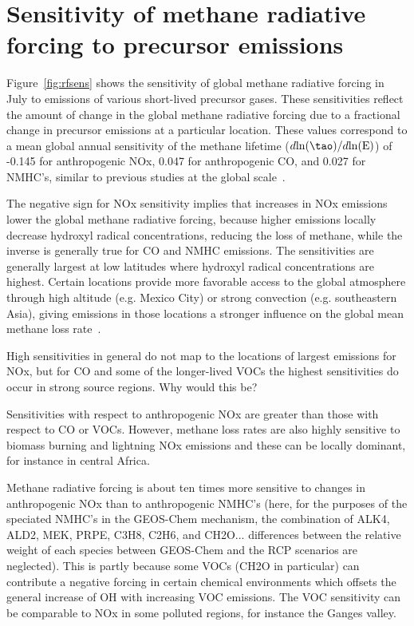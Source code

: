 \section{Sensitivity of methane radiative forcing to precursor emissions}

Figure~\ref{fig:rfsens} shows the sensitivity of global methane radiative forcing in July to emissions of various short-lived precursor gases. These sensitivities reflect the amount of change in the global methane radiative forcing due to a fractional change in precursor emissions at a particular location. These values correspond to a mean global annual sensitivity of the methane lifetime ($d \mathrm{ln}(\tao)/d \mathrm{ln}(\mathrm{E})$) of -0.145 for anthropogenic NOx, 0.047 for anthropogenic CO, and 0.027 for NMHC's, similar to previous studies at the global scale~\citep{ref:fry2012,ref:holmes2013}.

The negative sign for NOx sensitivity implies that increases in NOx emissions lower the global methane radiative forcing, because higher emissions locally decrease hydroxyl radical concentrations, reducing the loss of methane, while the inverse is generally true for CO and NMHC emissions. The sensitivities are generally largest at low latitudes where hydroxyl radical concentrations are highest. Certain locations provide more favorable access to the global atmosphere through high altitude (e.g. Mexico City) or strong convection (e.g. southeastern Asia), giving emissions in those locations a stronger influence on the global mean methane loss rate~\citep{ref:bowman2012}.

High sensitivities in general do not map to the locations of largest emissions for NOx, but for CO and some of the longer-lived VOCs the highest sensitivities do occur in strong source regions. Why would this be?

Sensitivities with respect to anthropogenic NOx are greater than those with respect to CO or VOCs. However, methane loss rates are also highly sensitive to biomass burning and lightning NOx emissions and these can be locally dominant, for instance in central Africa.

Methane radiative forcing is about ten times more sensitive to changes in anthropogenic NOx than to anthropogenic NMHC's (here, for the purposes of the speciated NMHC's in the GEOS-Chem mechanism, the combination of ALK4, ALD2, MEK, PRPE, C3H8, C2H6, and CH2O... differences between the relative weight of each species between GEOS-Chem and the RCP scenarios are neglected). This is partly because some VOCs (CH2O in particular) can contribute a negative forcing in certain chemical environments which offsets the general increase of OH with increasing VOC emissions. The VOC sensitivity can be comparable to NOx in some polluted regions, for instance the Ganges valley.

